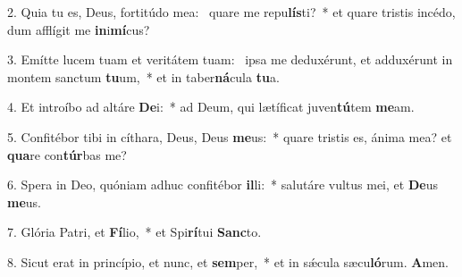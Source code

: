 2. Quia tu es, Deus, fortitúdo mea: \dag\  quare me repu\textbf{lís}ti?~*  et quare tristis incédo, dum afflígit me \textbf{in}i\textbf{mí}cus?\

3. Emítte lucem tuam et veritátem tuam: \dag\  ipsa me deduxérunt, et adduxérunt in montem sanctum \textbf{tu}um,~*  et in taber\textbf{ná}cula \textbf{tu}a.\

4. Et introíbo ad altáre \textbf{De}i:~*  ad Deum, qui lætíficat juven\textbf{tú}tem \textbf{me}am.\

5. Confitébor tibi in cíthara, Deus, Deus \textbf{me}us:~*  quare tristis es, ánima mea? et \textbf{qua}re con\textbf{túr}bas me?\

6. Spera in Deo, quóniam adhuc confitébor \textbf{il}li:~*  salutáre vultus mei, et \textbf{De}us \textbf{me}us.\

7. Glória Patri, et \textbf{Fí}lio,~*  et Spi\textbf{rí}tui \textbf{Sanc}to.\

8. Sicut erat in princípio, et nunc, et \textbf{sem}per,~*  et in sǽcula sæcu\textbf{ló}rum. \textbf{A}men.\

